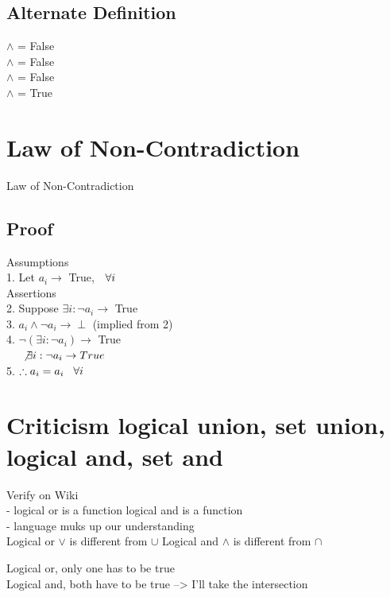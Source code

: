 \documentclass[11pt]{article}
\begin{document}
\subsection{Alternate Definition}
$\land$ \rbrack = False \\
 $\land$ \rbrack = False \\
 $\land$ \rbrack = False \\
 $\land$ \rbrack  = True

\section{Law of Non-Contradiction}
\begin{center}
Law of Non-Contradiction 
\end{center}

\subsection{Proof}
Assumptions\\
1. Let $a_i \rightarrow$ True, $\hspace{2mm} \forall i$
\\
Assertions\\
2. Suppose $\exists i : \neg a_i \rightarrow$ True\\
3. $a_i \land \neg a_i \rightarrow \perp$ \hspace{3mm} (implied from 2)\\
4. $\neg(\exists i : \neg a_i) \rightarrow$ True\\
\ \ \ $\not \exists i : \neg a_i \rightarrow True$\\
5. $\therefore a_i = a_i \hspace{3mm} \forall i$


\section{Criticism logical union, set union, logical and, set and}
Verify on Wiki \\
- logical or is a function logical and is a function\\
- language muks up our understanding\\

Logical or $\lor$ is different from $\cup$
Logical and $\land$ is different from $\cap$

Logical or, only one has to be true\\
Logical and, both have to be true --> I'll take the intersection\\
\end{document}
